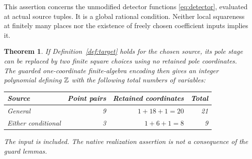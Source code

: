 \documentclass[11pt,a4paper]{article}
\newtheorem{theorem}{Theorem}[section]
\theoremstyle{definition}\newtheorem{definition}[theorem]{Definition}
\begin{document}
This assertion concerns the unmodified detector functions
\eqref{eq:detector}, evaluated at actual source tuples. It is a global
rational condition. Neither local squareness at finitely many places
nor the existence of freely chosen coefficient inputs implies it.

\begin{theorem}\label{thm:reduction}
If Definition~\ref{def:target} holds for the chosen source, its pole
stage can be replaced by two finite square choices using no retained
pole coordinates. The guarded one-coordinate finite-algebra encoding
then gives an integer polynomial defining $\mathbb Z$ with the following
total numbers of variables:
\begin{center}
\begin{tabular}{lrrr}\toprule
Source & Point pairs & Retained coordinates & Total\\\midrule
General &9&$1+18+1=20$&21\\
Either conditional &3&$1+6+1=8$&9\\\bottomrule
\end{tabular}
\end{center}
The input is included. The native realization assertion is not a
consequence of the guard lemmas.
\end{theorem}
\end{document}
